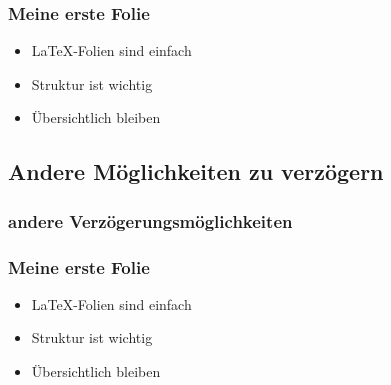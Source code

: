 \documentclass{beamer}
\begin{document}
\begin{frame}
\frametitle{Meine erste Folie}
  \begin{itemize}
    \item \LaTeX-Folien sind einfach\pause
    \item Struktur ist wichtig\pause
    \item Übersichtlich bleiben
  \end{itemize}
\end{frame}

\subsection{Andere Möglichkeiten zu verzögern}
\begin{frame}[fragile]
\frametitle{andere Verzögerungsmöglichkeiten}
  \begin{semiverbatim}
  \end{semiverbatim}
\end{frame}

\begin{frame}
\frametitle{Meine erste Folie}
  \begin{itemize}
    \item<1-> \LaTeX-Folien sind einfach
    \item<3-> Struktur ist wichtig
    \item<2-> Übersichtlich bleiben
  \end{itemize}
\end{frame}
\end{document}
